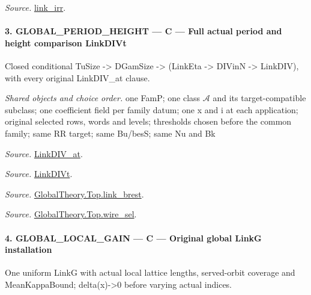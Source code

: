 \emph{Source.} \href{https://github.com/CocoSgt/riemann-hypothesis-lean/blob/7cbf7a0c32fca1badf05931879a37c3f8a2b03b4/src/Development/AbelianVarietyTheory/Proofs/GlobalInterpolation/LinkIRROfJoinEx.lean#L143-L166}{link\_\allowbreak irr}.



\paragraph{3. GLOBAL\_\allowbreak PERIOD\_\allowbreak HEIGHT — C — Full actual period and height comparison LinkDIVt}

Closed conditional TuSize -> DGamSize -> (LinkEta -> DIVinN -> LinkDIV), with every original LinkDIV\_\allowbreak at clause.

\emph{Shared objects and choice order.} one FamP; one class $\mathcal A$ and its target-compatible subclass; one coefficient field per family datum; one x and i at each application; original selected rows, words and levels; thresholds chosen before the common family; same RR target; same Bu/besS; same Nu and Bk

\emph{Source.} \href{https://github.com/CocoSgt/riemann-hypothesis-lean/blob/7cbf7a0c32fca1badf05931879a37c3f8a2b03b4/src/Formalism/SharpRestriction/GlobalTheoremInputs.lean#L77-L90}{LinkDIV\_\allowbreak at}.

\emph{Source.} \href{https://github.com/CocoSgt/riemann-hypothesis-lean/blob/7cbf7a0c32fca1badf05931879a37c3f8a2b03b4/src/Formalism/SharpRestriction/GlobalTheoremInputs.lean#L94-L96}{LinkDIVt}.

\emph{Source.} \href{https://github.com/CocoSgt/riemann-hypothesis-lean/blob/7cbf7a0c32fca1badf05931879a37c3f8a2b03b4/src/Development/AbelianVarietyTheory/Proofs/GlobalInterpolation/LinkBrest.lean#L7-L25}{GlobalTheory.Top.link\_\allowbreak brest}.

\emph{Source.} \href{https://github.com/CocoSgt/riemann-hypothesis-lean/blob/7cbf7a0c32fca1badf05931879a37c3f8a2b03b4/src/Development/AbelianVarietyTheory/Proofs/GlobalInterpolation/WireSel.lean#L11-L41}{GlobalTheory.Top.wire\_\allowbreak sel}.



\paragraph{4. GLOBAL\_\allowbreak LOCAL\_\allowbreak GAIN — C — Original global LinkG installation}

One uniform LinkG with actual local lattice lengths, served-orbit coverage and MeanKappaBound; delta(x)->0 before varying actual indices.

